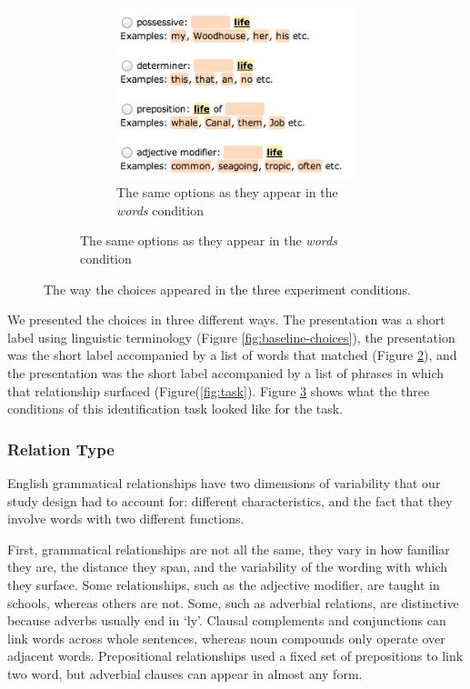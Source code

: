 \begin{figure}
\begin{subfigure}{0.7\columnwidth}
	    \begin{subfigure}{0.7\columnwidth}
	    	\centering
	    	\includegraphics[width=0.9\columnwidth]{fig/words-choices}
	        \caption {The same options as they appear in the \emph{words} condition \label{fig:words-choices}}
	    \end{subfigure}
	\end{subfigure}
\caption{\label{fig:choices} The way the choices appeared in the three experiment conditions.}
\end{figure}

We presented the choices in three different ways. The  presentation was a short label using linguistic terminology (Figure \ref{fig:baseline-choices}), the  presentation was the short label accompanied by a list of words that matched (Figure \ref{fig:words-choices}), and the  presentation was the short label accompanied by a list of phrases in which that relationship surfaced (Figure(\ref{fig:task}).  Figure \ref{fig:choices} shows what the three conditions of this identification task looked like for the  task.


\subsubsection{Relation Type}
English grammatical relationships have two dimensions of variability that our study design had to account for: different characteristics, and the fact that they involve words with two different functions.

First, grammatical relationships are not all the same, they vary in how familiar they are, the distance they span, and the variability of the wording with which they surface.  Some relationships, such as the adjective modifier, are taught in schools, whereas others are not. Some, such as adverbial relations, are distinctive because adverbs usually end in `ly'. Clausal complements and conjunctions can link words across whole sentences, whereas noun compounds only operate over adjacent words. Prepositional relationships used a fixed set of prepositions to link two word, but adverbial clauses can appear in almost any form.

